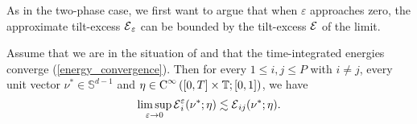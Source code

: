 As in the two-phase case, we first want to argue that when $ \varepsilon $ 
approaches zero, the approximate tilt-excess $ \tilt_excess_{ \varepsilon } $ 
can be bounded by the tilt-excess $ \tilt_excess $
of the limit.

\begin{lemma}
	\label{approximate_tilt_excess_estimated_in_limit_by_tilt_excess}
	Assume that we are in the situation of 
	 and that the time-integrated 
	energies converge (\ref{energy_convergence}). Then for every $ 1 \leq i , j 
	\leq P $ with $ i \neq j $, every unit vector $ \nu^{ \ast } \in \mathbb{ S 
	}^{ d - 1 } $ and 
	$ \eta \in \operatorname{C}^{ \infty } \left( [ 0 , T ] \times \operatorname{\mathbb{T}} ; [ 0 ,1 ] 
	\right) $, we have
	\begin{equation*}
		\limsup_{ \varepsilon \to 0 }
		\tilt_excess_{ i }^{ \varepsilon } ( \nu^{ \ast } ; \eta  ) 
		\lesssim
		\tilt_excess_{ i j } ( \nu^{ \ast } ; \eta ).
	\end{equation*}
\end{lemma}

